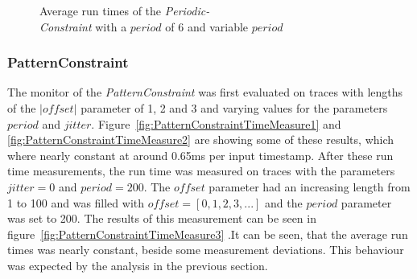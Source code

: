 \begin{figure}
\begin{minipage}{0.45\textwidth}
		\centering
		\caption{Average run times of the \textit{Periodic-\\Constraint} with a $period$ of 6 and variable $period$}
		\label{fig:PeriodicConstrainttRunTime2}
	\end{minipage}
\end{figure}



\subsubsection{PatternConstraint}
	The monitor of the \emph{PatternConstraint} was first evaluated on traces with lengths of the $|offset|$ parameter of 1, 2 and 3 and varying values for the parameters $period$ and $jitter$. Figure~\ref{fig:PatternConstraintTimeMeasure1} and \ref{fig:PatternConstraintTimeMeasure2} are showing some of these results, which where nearly constant at around 0.65ms per input timestamp. After these run time measurements, the run time was measured on traces with the parameters $jitter=0$ and $period=200$. The $offset$ parameter had an increasing length from 1 to 100 and was filled with $offset=[0, 1, 2, 3, ...]$ and the $period$ parameter was set to 200. The results of this measurement can be seen in figure~\ref{fig:PatternConstraintTimeMeasure3} .It can be seen, that the average run times was nearly constant, beside some measurement deviations. This behaviour was expected by the analysis in the previous section.
	
